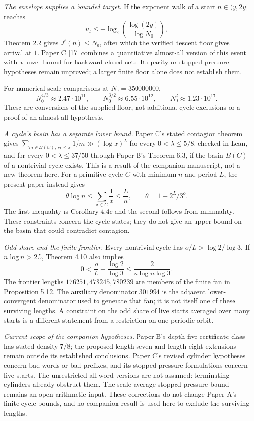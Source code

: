 \documentclass[12pt]{article}
\begin{document}
\emph{The envelope supplies a bounded target.} If the exponent walk of a
start \(n\in(y,2y]\) reaches \[
u_t\le-\log_2\!\left(\frac{\log(2y)}{\log N_0}\right),
\] Theorem 2.2 gives \(J^t(n)\le N_0\), after which the verified descent
floor gives arrival at \(1\). Paper C {[}17{]} combines a quantitative
almost-all version of this event with a lower bound for backward-closed
sets. Its parity or stopped-pressure hypotheses remain unproved; a
larger finite floor alone does not establish them.

For numerical scale comparisons at \(N_0=350000000\), \[
N_0^{4/3}\approx2.47\cdot10^{11},\qquad
N_0^{3/2}\approx6.55\cdot10^{12},\qquad
N_0^2\approx1.23\cdot10^{17}.
\] These are conversions of the supplied floor, not additional cycle
exclusions or a proof of an almost-all hypothesis.

\emph{A cycle's basin has a separate lower bound.} Paper C's stated
contagion theorem gives
\(\sum_{m\in B(C),\,m\le x}1/m\gg(\log x)^\lambda\) for every
\(0<\lambda\le5/8\), checked in Lean, and for every
\(0<\lambda\le37/50\) through Paper B's Theorem 6.3, if the basin
\(B(C)\) of a nontrivial cycle exists. This is a result of the companion
manuscript, not a new theorem here. For a primitive cycle \(C\) with
minimum \(n\) and period \(L\), the present paper instead gives \[
\theta\log n\le\sum_{x\in C}\frac1x\le\frac Ln,
\qquad \theta=1-2^L/3^o.
\] The first inequality is Corollary 4.4c and the second follows from
minimality. These constraints concern the cycle states; they do not give
an upper bound on the basin that could contradict contagion.

\emph{Odd share and the finite frontier.} Every nontrivial cycle has
\(o/L>\log2/\log3\). If \(n\log n>2L\), Theorem 4.10 also implies \[
0<\frac oL-\frac{\log2}{\log3}
\le\frac{2}{n\log n\log3}.
\] The frontier lengths \(176251,478245,780239\) are members of the
finite fan in Proposition 5.12. The auxiliary denominator \(301994\) is
the adjacent lower-convergent denominator used to generate that fan; it
is not itself one of these surviving lengths. A constraint on the odd
share of live starts averaged over many starts is a different statement
from a restriction on one periodic orbit.

\emph{Current scope of the companion hypotheses.} Paper B's depth-five
certificate class has stated density \(7/8\); the proposed length-seven
and length-eight extensions remain outside its established conclusions.
Paper C's revised cylinder hypotheses concern bad words or bad prefixes,
and its stopped-pressure formulations concern live starts. The
unrestricted all-word versions are not assumed: terminating cylinders
already obstruct them. The scale-average stopped-pressure bound remains
an open arithmetic input. These corrections do not change Paper A's
finite cycle bounds, and no companion result is used here to exclude the
surviving lengths.
\end{document}
